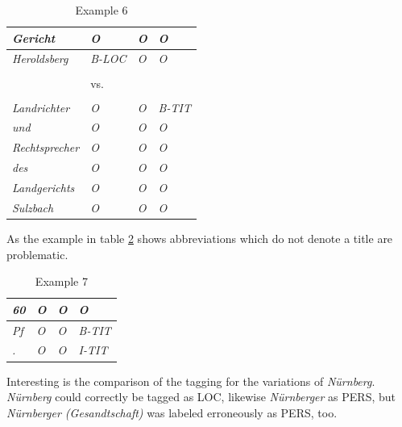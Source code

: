 \documentclass[11pt,a4paper]{article}
\begin{document}
\begin{table}
	\centering
	\begin{tabular}{l l l l}
		\textit{Gericht} & \textit{O} & \textit{O} & \textit{\textcolor{customRed}{O}}\\ \hline
		\textit{Heroldsberg} & \textit{\textcolor{customGreen}{B-LOC}} & \textit{O} & \textit{\textcolor{customRed}{O}}\\ \hline
		\\
		&vs. \\
		\\ \hline
		\textit{Landrichter} & \textit{O} & \textit{O} & \textit{\textcolor{customGreen}{B-TIT}}\\ \hline
		\textit{und} & \textit{O} & \textit{O} & \textit{\textcolor{customRed}{O}}\\ \hline
		\textit{Rechtsprecher} & \textit{O} & \textit{O} & \textit{\textcolor{customRed}{O}}\\ \hline
		\textit{des} & \textit{O} & \textit{O} & \textit{\textcolor{customRed}{O}}\\ \hline
		\textit{Landgerichts} & \textit{O} & \textit{O} & \textit{\textcolor{customRed}{O}}\\ \hline
		\textit{Sulzbach} & \textit{\textcolor{customRed}{O}} & \textit{O} & \textit{\textcolor{customRed}{O}}\\ \hline
	\end{tabular}
	\caption{Example 6}
	\label{tab:example6}
\end{table}

As the example in table \ref{tab:example7} shows abbreviations which do not denote a title are problematic.

\begin{table}
	\centering
	\begin{tabular}{l l l l}
		\textit{60} & \textit{O} & \textit{O} & \textit{O}\\ \hline
		\textit{Pf} & \textit{O} & \textit{O} & \textit{\textcolor{customRed}{B-TIT}}\\ \hline
		\textit{.} & \textit{O} & \textit{O} & \textit{\textcolor{customRed}{I-TIT}}\\ \hline
	\end{tabular}
	\caption{Example 7}
	\label{tab:example7}
\end{table}

Interesting is the comparison of the tagging for the variations of \textit{N{\"u}rnberg}. \textit{N{\"u}rnberg} could correctly be tagged as LOC, likewise \textit{N{\"u}rnberger} as PERS, but \textit{N{\"u}rnberger (Gesandtschaft)} was labeled erroneously as PERS, too.
\end{document}

